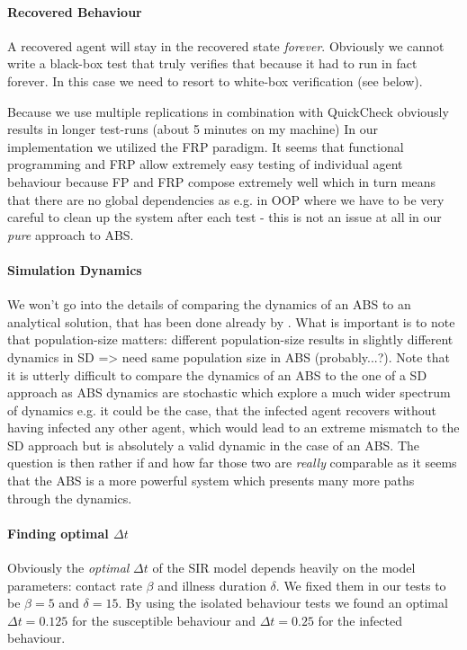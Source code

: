 \paragraph{Recovered Behaviour}
A recovered agent will stay in the recovered state \textit{forever}. Obviously we cannot write a black-box test that truly verifies that because it had to run in fact forever. In this case we need to resort to white-box verification (see below).

Because we use multiple replications in combination with QuickCheck obviously results in longer test-runs (about 5 minutes on my machine)
In our implementation we utilized the FRP paradigm. It seems that functional programming and FRP allow extremely easy testing of individual agent behaviour because FP and FRP compose extremely well which in turn means that there are no global dependencies as e.g. in OOP where we have to be very careful to clean up the system after each test - this is not an issue at all in our \textit{pure} approach to ABS.

\paragraph{Simulation Dynamics}
We won't go into the details of comparing the dynamics of an ABS to an analytical solution, that has been done already by \cite{macal_agent-based_2010}. What is important is to note that population-size matters: different population-size results in slightly different dynamics in SD => need same population size in ABS (probably...?). Note that it is utterly difficult to compare the dynamics of an ABS to the one of a SD approach as ABS dynamics are stochastic which explore a much wider spectrum of dynamics e.g. it could be the case, that the infected agent recovers without having infected any other agent, which would lead to an extreme mismatch to the SD approach but is absolutely a valid dynamic in the case of an ABS. The question is then rather if and how far those two are \textit{really} comparable as it seems that the ABS is a more powerful system which presents many more paths through the dynamics.

\paragraph{Finding optimal $\Delta t$}
Obviously the \textit{optimal} $\Delta t$ of the SIR model depends heavily on the model parameters: contact rate $\beta$ and illness duration $\delta$. We fixed them in our tests to be $\beta = 5$ and $\delta = 15$. By using the isolated behaviour tests we found an optimal $\Delta t = 0.125$ for the susceptible behaviour and $\Delta t = 0.25$ for the infected behaviour. %

